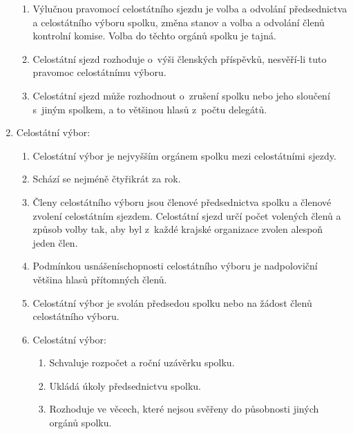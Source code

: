 \documentclass[a4paper]{article}
\begin{document}
\begin{enumerate}
\begin{enumerate}
        \item Výlučnou pravomocí celostátního sjezdu je volba a odvolání
            předsednictva a celostátního výboru spolku, změna stanov a volba
            a odvolání členů kontrolní komise. Volba do těchto orgánů
            spolku je tajná.

        \item Celostátní sjezd rozhoduje o~výši členských příspěvků,
            nesvěří-li tuto pravomoc celostátnímu výboru.

        \item Celostátní sjezd může rozhodnout o~zrušení spolku nebo jeho
            sloučení s~jiným spolkem, a to  většinou hlasů
            z~počtu delegátů.
        \end{enumerate}

    \item Celostátní výbor:
        \begin{enumerate}
        \item Celostátní výbor je nejvyšším orgánem spolku mezi 
            celostátními sjezdy.

        \item Schází se nejméně čtyřikrát za rok.

        \item Členy celostátního výboru jsou členové předsednictva
            spolku a členové zvolení celostátním sjezdem.
            Celostátní sjezd určí počet volených členů a způsob volby
            tak, aby byl z~každé krajské organizace zvolen alespoň
            jeden člen.

        \item Podmínkou usnášeníschopnosti celostátního výboru
            je nadpoloviční většina hlasů přítomných členů.

        \item Celostátní výbor je svolán předsedou spolku
            nebo na žádost  členů
            celostátního výboru.

        \item Celostátní výbor:
            \begin{enumerate}
            \item Schvaluje rozpočet a roční uzávěrku spolku.

            \item Ukládá úkoly předsednictvu spolku.

            \item Rozhoduje ve věcech, které nejsou svěřeny
                do působnosti jiných orgánů spolku.


\end{enumerate}
\end{enumerate}
\end{enumerate}
\end{document}
